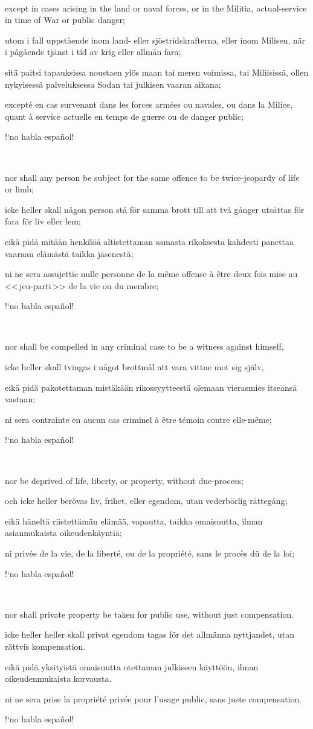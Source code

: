 \documentclass[a4paper,landscape,10pt]{article}
\newcommand{\tblock}[5]{\noindent\begin{minipage}[t]{0.18\textwidth}\foreignlanguage{english}{#1}\end{minipage}\hskip 0.025\textwidth\begin{minipage}[t]{0.18\textwidth}\foreignlanguage{swedish}{#2}\end{minipage}\hskip 0.025\textwidth\begin{minipage}[t]{0.18\textwidth}\foreignlanguage{finnish}{#3}\end{minipage}\hskip 0.025\textwidth\begin{minipage}[t]{0.18\textwidth}\foreignlanguage{french}{#4}\end{minipage}\hskip 0.025\textwidth\begin{minipage}[t]{0.18\textwidth}\foreignlanguage{spanish}{#5}\end{minipage}}
\begin{document}
~

\tblock
{except in cases arising in the land or naval forces, or in the Militia, \gls{actual-service} in time of War or public danger;}
{utom i fall uppstående inom land- eller sjöstridskrafterna, eller inom Milisen, när i pågående tjänst i tid av krig eller allmän fara;}
{sitä paitsi tapauksissa noustaen ylös maan tai meren voimissa, tai Miliisissä, ollen nykyisessä palveluksessa Sodan tai julkisen vaaran aikana;}
{excepté en cas survenant dans les forces armées ou navales, ou dans la Milice, quant à service actuelle en temps de guerre ou de danger public;}
{!`no habla español!}

~

\tblock
{nor shall any person be subject for the same offence to be \gls{twice-jeopardy} of life or limb;}
{icke heller skall någon person stå för samma brott till att två gånger utsättas för fara för liv eller lem;}
{eikä pidä mitään henkilöä altistettaman samasta rikoksesta kahdesti panettaa vaaraan elämästä taikka jäsenestä;}
{ni ne sera assujettie nulle personne de la même offense à être deux fois mise au <<\,jeu-parti\,>> de la vie ou du membre;}
{!`no habla español!}

~

\tblock
{nor shall be compelled in any criminal case to be a \gls{witness} against himself,}
{icke heller skall tvingas i något brottmål att vara vittne mot sig själv,}
{eikä pidä pakotettaman mistäkään rikossyytteestä olemaan vierasmies itseänsä vastaan;}
{ni sera contrainte en aucun cas criminel à être témoin contre elle-même;}
{!`no habla español!}

~

\tblock
{nor be deprived of life, liberty, or property, without \gls{due-process};}
{och icke heller berövas liv, frihet, eller egendom, utan vederbörlig rättegång;}
{eikä häneltä riistettämän elämää, vapautta, taikka omaisuutta, ilman asianmukaista oikeudenkäyntiä;}
{ni privée de la vie, de la liberté, ou de la propriété, sans le procès dû de la loi;}
{!`no habla español!}

~

\tblock
{nor shall private property be taken for public use, without just compensation.}
{icke heller heller skall privat egendom tagas för det allmänna nyttjandet, utan rättvis kompensation.}
{eikä pidä yksityistä omaisuutta otettaman julkiseen käyttöön, ilman oikeudenmukaista korvausta.}
{ni ne sera prise la propriété privée pour l'usage public, sans juste compensation.}
{!`no habla español!}
\end{document}
